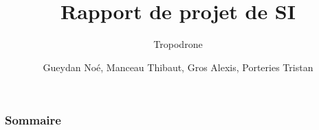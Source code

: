 \documentclass{beamer}
\title{Rapport de projet de SI}
\subtitle{Tropodrone}
\author{Gueydan Noé, Manceau Thibaut, Gros Alexis, Porteries Tristan}
\begin{document}
\begin{frame}
  \titlepage
\end{frame}

\begin{frame}
    \frametitle{Sommaire}
    \begin{multicols}{2}
      {
		\setcounter{tocdepth}{1}
        \tableofcontents
      }
    \end{multicols}
\end{frame}
\end{document}

